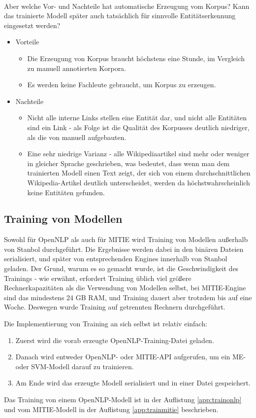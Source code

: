 \paragraph{}
Aber welche Vor- und Nachteile hat automatische Erzeugung vom Korpus? Kann das trainierte Modell später auch tatsächlich für sinnvolle Entitätserkennung eingesetzt werden?
\begin{itemize}
\item Vorteile
\begin{itemize}
\item Die Erzeugung von Korpus braucht höchstens eine Stunde, im Vergleich zu manuell annotierten Korpora.
\item Es werden keine Fachleute gebraucht, um Korpus zu erzeugen.
\end{itemize}
\item Nachteile
\begin{itemize}
\item Nicht alle interne Links stellen eine Entität dar, und nicht alle Entitäten sind ein Link - als Folge ist die Qualität des Korpusses deutlich niedriger, als die von manuell aufgebauten.
\item Eine sehr niedrige Varianz - alle Wikipediaartikel sind mehr oder weniger in gleicher Sprache geschrieben, was bedeutet, dass wenn man dem trainierten Modell einen Text zeigt, der sich von einem durchschnittlichen Wikipedia-Artikel deutlich unterscheidet, werden da höchstwahrscheinlich keine Entitäten gefunden.
\end{itemize}
\end{itemize}

\subsection{Training von Modellen} \label{subsec:TRMODELLS}
Sowohl für OpenNLP als auch für MITIE wird Training von Modellen außerhalb von Stanbol durchgeführt. Die Ergebnisse werden dabei in den binären Dateien serialisiert, und später von entsprechenden Engines innerhalb von Stanbol geladen. Der Grund, warum es so gemacht wurde, ist die Geschwindigkeit des Trainings - wie erwähnt, erfordert Training üblich viel größere Rechnerkapazitäten als die Verwendung von Modellen selbst, bei MITIE-Engine sind das mindestens 24 GB RAM, und Training dauert aber trotzdem bis auf eine Woche. Deswegen wurde Training auf getrennten Rechnern durchgeführt.

Die Implementierung von Training an sich selbst ist relativ einfach: 
\begin{enumerate}
\item Zuerst wird die vorab erzeugte OpenNLP-Training-Datei geladen.
\item Danach wird entweder OpenNLP- oder MITIE-API aufgerufen, um ein ME- oder SVM-Modell darauf zu trainieren.
\item Am Ende wird das erzeugte Modell serialisiert und in einer Datei gespeichert.
\end{enumerate}
Das Training von einem OpenNLP-Modell ist in der Auflistung \ref{app:trainonlp} und vom MITIE-Modell in der Auflistung \ref{app:trainmitie} beschrieben.

